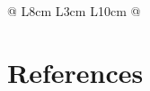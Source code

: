 \begin{refsection}
\begin{landscape}
\begin{longtable}{@{} L{8cm} L{3cm} L{10cm} @{}}
\end{longtable}
\end{landscape}



\newpage
\section{References}
\label{sec:References for Manure Module}
\printbibliography[heading=subbibliography,title={}]
\end{refsection}

